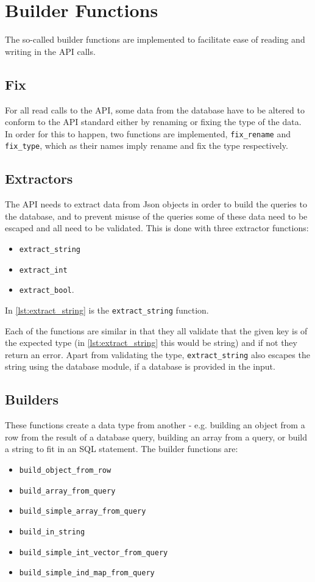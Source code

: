 \section{Builder Functions}
The so-called builder functions are implemented to facilitate ease of reading and writing in the API calls.

\subsection{Fix}
For all read calls to the API, some data from the database have to be altered to conform to the API standard either by renaming or fixing the type of the data. In order for this to happen, two functions are implemented,  \lstinline|fix_rename| and  \lstinline|fix_type|, which as their names imply rename and fix the type respectively. 

\subsection{Extractors}
The API needs to extract data from Json objects in order to build the queries to the database, and to prevent misuse of the queries some of these data need to be escaped and all need to be validated. This is done with three extractor functions: 
\begin{itemize}
\item \lstinline|extract_string| 
\item \lstinline|extract_int| 
\item \lstinline|extract_bool|. 
\end{itemize}
In \autoref{lst:extract_string} is the \lstinline|extract_string| function.



Each of the functions are similar in that they all validate that the given key is of the expected type (in \autoref{lst:extract_string} this would be string) and if not they return an error. Apart from validating the type, \lstinline|extract_string| also escapes the string using the database module, if a database is provided in the input.

\subsection{Builders}
These functions create a data type from another - e.g. building an object from a row from the result of a database query, building an array from a query, or build a string to fit in an SQL statement. The builder functions are:
\begin{itemize}
\item \lstinline|build_object_from_row|
\item \lstinline|build_array_from_query|
\item \lstinline|build_simple_array_from_query|
\item \lstinline|build_in_string|
\item \lstinline|build_simple_int_vector_from_query|
\item \lstinline|build_simple_ind_map_from_query|
\end{itemize}

